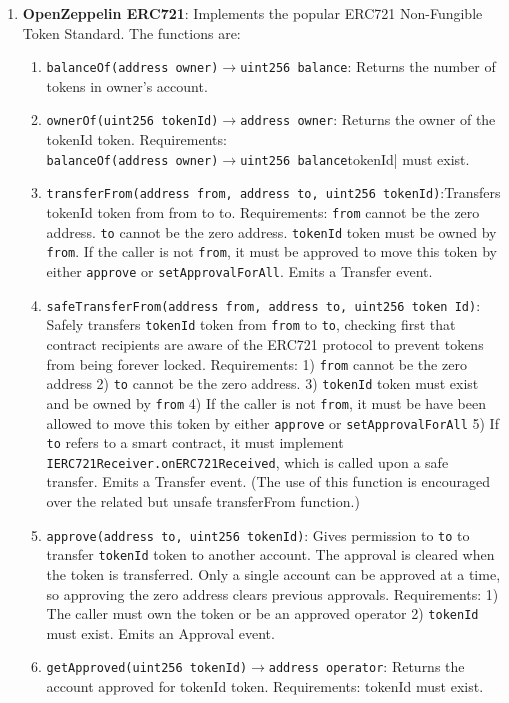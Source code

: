 \begin{enumerate}
\item\textbf{OpenZeppelin ERC721}: Implements the popular ERC721 Non-Fungible Token Standard. The functions are:
	\begin{enumerate}
	\item\verb|balanceOf(address owner)|$\rightarrow$\verb|uint256 balance|: Returns the number of tokens in owner's account.
	\item\verb|ownerOf(uint256 tokenId)|$\rightarrow$\verb|address owner|: Returns the owner of the tokenId token. Requirements:\\\verb|balanceOf(address owner)|$\rightarrow$\verb|uint256 balance|tokenId| must exist.
	\item\verb|transferFrom(address from, address to, uint256 tokenId)|:\linebreak Transfers tokenId token from from to to. Requirements: \verb|from| cannot be the zero address. \verb|to| cannot be the zero address. \verb|tokenId| token must be owned by \verb|from|. If the caller is not \verb|from|, it must be approved to move this token by either \verb|approve| or \verb|setApprovalForAll|. Emits a Transfer event.
	\item\verb|safeTransferFrom(address from, address to, uint256 token Id)|: Safely transfers \verb|tokenId| token from \verb|from| to \verb|to|, checking first that contract recipients are aware of the ERC721 protocol to prevent tokens from being forever locked. Requirements: 1) \verb|from| cannot be the zero address 2) \verb|to| cannot be the zero address. 3) \verb|tokenId| token must exist and be owned by \verb|from| 4) If the caller is not \verb|from|, it must be have been allowed to move this token by either \verb|approve| or \verb|setApprovalForAll| 5) If \verb|to| refers to a smart contract, it must implement \verb|IERC721Receiver.onERC721Received|, which is called upon a safe transfer. Emits a Transfer event. (The use of this function is encouraged over the related but unsafe transferFrom function.)
	\item\verb|approve(address to, uint256 tokenId)|: Gives permission to \verb|to| to transfer \verb|tokenId| token to another account. The approval is cleared when the token is transferred. Only a single account can be approved at a time, so approving the zero address clears previous approvals. Requirements: 1) The caller must own the token or be an approved operator 2) \verb|tokenId| must exist. Emits an Approval event.
	\item\verb|getApproved(uint256 tokenId)|$\rightarrow$\verb|address operator|: Returns the account approved for tokenId token. Requirements: tokenId must exist.

\end{enumerate}
\end{enumerate}
